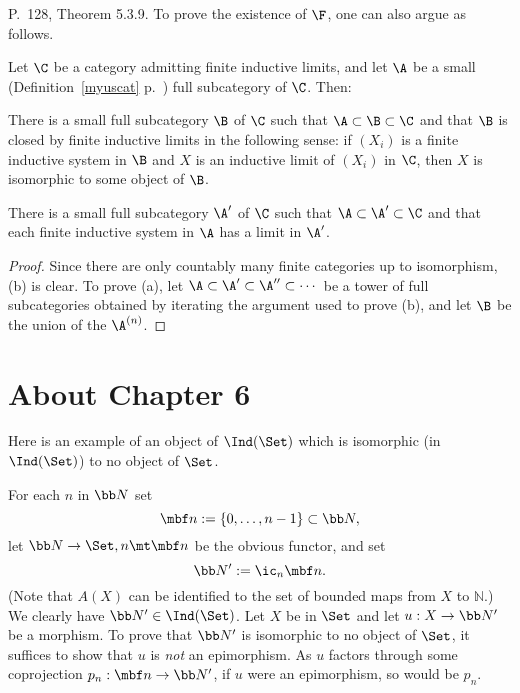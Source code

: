 \documentclass[12pt]{article}
\theoremstyle{remark}
\theoremstyle{definition}
\begin{document}
%

\begin{s}
P.~128, Theorem 5.3.9. To prove the existence of $\F$, one can also argue as follows. 

\begin{lem} 
Let $\C$ be a category admitting finite inductive limits, and let $\A$ be a small (Definition~\ref{myuscat} p.~) full subcategory of $\C$. Then:

 There is a small full subcategory $\B$ of $\C$ such that $\A\subset\B\subset \C$ and that $\B$ is closed by finite inductive limits in the following sense: if $(X_i)$ is a finite inductive system in $\B$ and $X$ is an inductive limit of $(X_i)$ in $\C$, then $X$ is isomorphic to some object of $\B$.

 There is a small full subcategory $\A'$ of $\C$ such that $\A\subset\A'\subset \C$ and that each finite inductive system in $\A$ has a limit in $\A'$. 
\end{lem} 

\begin{proof}
Since there are only countably many finite categories up to isomorphism, (b) is clear. To prove (a), let $\A\subset\A'\subset\A''\subset\cdots$ be a tower of full subcategories obtained by iterating the argument used to prove (b), and let $\B$ be the union of the $\A^{(n)}$.
\end{proof}
\end{s}


\section{About Chapter 6}


Here is an example of an object of $\Ind(\Set)$ which is isomorphic (in $\Ind(\Set)$) to no object of $\Set$. 

For each $n$ in $\bb N$ set 
$$
\mbf n:=\{0,\dots,n-1\}\subset\bb N,
$$ 
let $\bb N\to\Set,n\mt\mbf n$ be the obvious functor, and set 
$$
\bb N':=\ic_n\mbf n. 
$$ 
(Note that $A(X)$ can be identified to the set of bounded maps from $X$ to $\mathbb N$.) We clearly have $\bb N'\in\Ind(\Set)$. Let $X$ be in $\Set$ and let $u:X\to\bb N'$ be a morphism. To prove that $\bb N'$ is isomorphic to no object of $\Set$, it suffices to show that $u$ is \emph{not} an epimorphism. As $u$ factors through some coprojection $p_n:\mbf n\to\bb N'$, if $u$ were an epimorphism, so would be $p_n$.  
\end{document}

